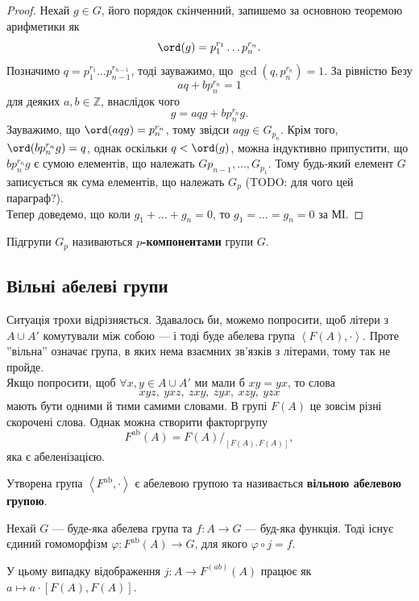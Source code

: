 \documentclass{math_library}
\begin{document}
\begin{proof}
Нехай $g \in G$, його порядок скінченний, запишемо за основною теоремою арифметики як
\[
\ord(g) = p_1^{r_1} \dots p_n^{r_n}.
\]
Позначимо $q = p_1^{r_1} \dots p_{n-1}^{r_{n-1}}$, тоді зауважимо, що $\gcd(q, p_n^{r_n}) = 1$. За рівністю Безу
\[
aq + bp_n^{r_n} = 1
\]
для деяких $a,b \in \mathbb{Z}$, внаслідок чого
\[
g = aq g + b p_n^{r_n} g.
\]
Зауважимо, що $\ord(aqg) = p_n^{r_n}$, тому звідси $aqg \in G_{p_n}$. Крім того, $\ord(bp_n^{r_n} g) = q$, однак оскільки $q < \ord(g)$, можна індуктивно припустити, що $bp_n^{r_n} g$ є сумою елементів, що належать $Gp_{n-1}, \dots, G_{p_1}$. Тому будь-який елемент $G$ записується як сума елементів, що належать $G_p$ (TODO: для чого цей параграф?).
\bigskip \\
Тепер доведемо, що коли $g_1 + \dots + g_n = 0$, то $g_1 = \dots = g_n = 0$ за МІ.
\end{proof}

\begin{definition}
Підгрупи $G_p$ називаються \textbf{$p$-компонентами} групи $G$.
\end{definition}

\subsection{Вільні абелеві групи}
Ситуація трохи відрізняється. Здавалось би, можемо попросити, щоб літери з $A \cup A'$ комутували між собою --- і тоді буде абелева група $\left<F(A), \cdot \right>$. Проте ''вільна'' означає група, в яких нема взаємних зв'язків з літерами, тому так не пройде.
\bigskip \\
Якщо попросити, щоб $\forall x,y \in A \cup A'$ ми мали б $xy = yx$, то слова
\[
xyz,\ yxz,\ zxy,\ zyx,\ xzy,\ yzx
\]
мають бути одними й тими самими словами. В групі $F(A)$ це зовсім різні скорочені слова. Однак можна створити факторгрупу
\[
F^{\text{ab}}(A) = F(A)/_{[F(A),F(A)]},
\]
яка є абеленізацією.

\begin{corollary}
Утворена група $\left<F^{\text{ab}}, \cdot \right>$ є абелевою групою та називається \textbf{вільною абелевою групою}.
\end{corollary}

\begin{theorem}
Нехай $G$ --- буде-яка абелева група та $f \colon A \to G$ --- буд-яка функція. Тоді існує єдиний гомоморфізм $\varphi \colon F^{\text{ab}}(A) \to G$, для якого $\varphi \circ j = f$.
\begin{figure}[H]
\centering
{}
\end{figure}
У цьому випадку відображення $j \colon A \to F^{(ab)}(A)$ працює як $a \mapsto a \cdot [F(A),F(A)]$.
\end{theorem}
\end{document}
